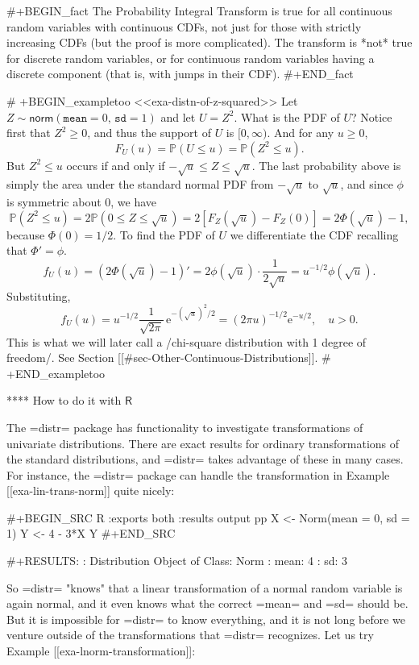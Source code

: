 #+BEGIN_fact
The Probability Integral Transform is true for all continuous random
variables with continuous CDFs, not just for those with strictly
increasing CDFs (but the proof is more complicated). The transform is
*not* true for discrete random variables, or for continuous random
variables having a discrete component (that is, with jumps in their
CDF).
#+END_fact

# +BEGIN_exampletoo
<<exa-distn-of-z-squared>> Let
\(Z\sim\mathsf{norm}(\mathtt{mean}=0,\,\mathtt{sd}=1)\) and let
\(U=Z^{2}\). What is the PDF of \(U\)?  Notice first that
\(Z^{2}\geq0\), and thus the support of \(U\) is \([0,\infty)\). And
for any \(u\geq0\), \[ F_{U}(u)=\mathbb{P}(U\leq
u)=\mathbb{P}(Z^{2}\leq u).  \] But \(Z^{2}\leq u\) occurs if and only
if \(-\sqrt{u}\leq Z\leq\sqrt{u}\). The last probability above is
simply the area under the standard normal PDF from \(-\sqrt{u}\) to
\(\sqrt{u}\), and since \(\phi\) is symmetric about 0, we have \[
\mathbb{P}(Z^{2}\leq u)=2\mathbb{P}(0\leq
Z\leq\sqrt{u})=2\left[F_{Z}(\sqrt{u})-F_{Z}(0)\right]=2\Phi(\sqrt{u})-1,
\] because \(\Phi(0)=1/2\). To find the PDF of \(U\) we differentiate
the CDF recalling that \(\Phi'= \phi\).  \[
f_{U}(u)=\left(2\Phi(\sqrt{u})-1\right)'=2\phi(\sqrt{u})\cdot\frac{1}{2\sqrt{u}}=u^{-1/2}\phi(\sqrt{u}).
\] Substituting, \[ f_{U}(u) =
u^{-1/2}\frac{1}{\sqrt{2\pi}}\,\mathrm{e}^{-(\sqrt{u})^{2}/2}=(2\pi
u)^{-1/2}\mathrm{e}^{-u/2},\quad u > 0.  \] This is what we will later
call a /chi-square distribution with 1 degree of freedom/. See Section
[[#sec-Other-Continuous-Distributions]].
# +END_exampletoo

**** How to do it with \(\mathsf{R}\)

The =distr= package \cite{distr} has functionality to investigate
transformations of univariate distributions. There are exact results
for ordinary transformations of the standard distributions, and
=distr= takes advantage of these in many cases. For instance, the
=distr= package can handle the transformation in Example [[exa-lin-trans-norm]] quite nicely:

#+BEGIN_SRC R :exports both :results output pp 
X <- Norm(mean = 0, sd = 1)
Y <- 4 - 3*X
Y
#+END_SRC

#+RESULTS:
: Distribution Object of Class: Norm
:  mean: 4
:  sd: 3

So =distr= "knows" that a linear transformation of a normal random
variable is again normal, and it even knows what the correct =mean=
and =sd= should be. But it is impossible for =distr= to know
everything, and it is not long before we venture outside of the
transformations that =distr= recognizes. Let us try Example
[[exa-lnorm-transformation]]:

